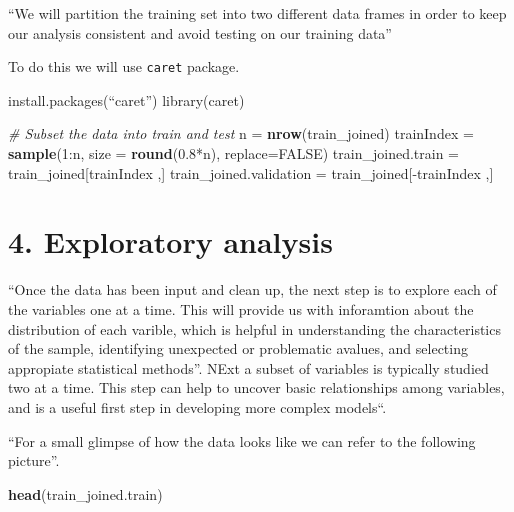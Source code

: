\documentclass[11pt,]{article}
\newenvironment{Shaded}{\begin{snugshade}}{\end{snugshade}}
\newcommand{\KeywordTok}[1]{\textcolor[rgb]{0.13,0.29,0.53}{\textbf{{#1}}}}
\newcommand{\DataTypeTok}[1]{\textcolor[rgb]{0.13,0.29,0.53}{{#1}}}
\newcommand{\DecValTok}[1]{\textcolor[rgb]{0.00,0.00,0.81}{{#1}}}
\newcommand{\FloatTok}[1]{\textcolor[rgb]{0.00,0.00,0.81}{{#1}}}
\newcommand{\StringTok}[1]{\textcolor[rgb]{0.31,0.60,0.02}{{#1}}}
\newcommand{\CommentTok}[1]{\textcolor[rgb]{0.56,0.35,0.01}{\textit{{#1}}}}
\newcommand{\OtherTok}[1]{\textcolor[rgb]{0.56,0.35,0.01}{{#1}}}
\newcommand{\NormalTok}[1]{{#1}}
\begin{document}
``We will partition the training set into two different data frames in
order to keep our analysis consistent and avoid testing on our training
data''

To do this we will use \texttt{caret} package.

install.packages(``caret'') library(caret)

\begin{Shaded}
\begin{Highlighting}[]
\CommentTok{# Subset the data into train and test}
\NormalTok{n =}\StringTok{ }\KeywordTok{nrow}\NormalTok{(train_joined)}
\NormalTok{trainIndex =}\StringTok{ }\KeywordTok{sample}\NormalTok{(}\DecValTok{1}\NormalTok{:n, }\DataTypeTok{size =} \KeywordTok{round}\NormalTok{(}\FloatTok{0.8}\NormalTok{*n), }\DataTypeTok{replace=}\OtherTok{FALSE}\NormalTok{)}
\NormalTok{train_joined.train =}\StringTok{ }\NormalTok{train_joined[trainIndex ,]}
\NormalTok{train_joined.validation =}\StringTok{ }\NormalTok{train_joined[-trainIndex ,]}
\end{Highlighting}
\end{Shaded}

\section{4. Exploratory analysis}\label{exploratory-analysis}

``Once the data has been input and clean up, the next step is to explore
each of the variables one at a time. This will provide us with
inforamtion about the distribution of each varible, which is helpful in
understanding the characteristics of the sample, identifying unexpected
or problematic avalues, and selecting appropiate statistical methods''.
NExt a subset of variables is typically studied two at a time. This step
can help to uncover basic relationships among variables, and is a useful
first step in developing more complex models``.

``For a small glimpse of how the data looks like we can refer to the
following picture''.

\begin{Shaded}
\begin{Highlighting}[]
\KeywordTok{head}\NormalTok{(train_joined.train)}
\end{Highlighting}
\end{Shaded}
\end{document}
